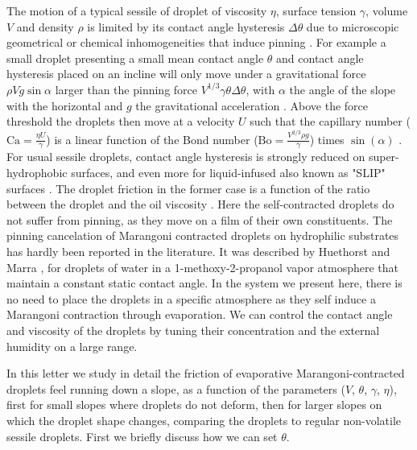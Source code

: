 \documentclass[aps,prl,reprint,superscriptaddress,amsmath,amssymb,]{revtex4-1}
\begin{document}
The motion of a typical sessile of droplet of viscosity $\eta$, surface tension $\gamma$, volume $V$ and density $\rho$ is limited by its contact angle hysteresis $\Delta \theta$ due to microscopic geometrical or chemical inhomogeneities that induce pinning \cite{furmidge1962studies, dussan1983ability, dussan1985ability}. For example a small droplet presenting a small mean contact angle $\theta$ and contact angle hysteresis placed on an incline will only move under a gravitational force $\rho V g \sin \alpha$ larger than the pinning force $V^{1/3} \gamma \theta \Delta \theta$, with $\alpha$ the angle of the slope with the horizontal and $g$ the gravitational acceleration \cite{kawasaki1960study, dussan1983ability, quere1998drops}. Above the force threshold the droplets then move at a velocity $U$ such that the capillary number ($\mathrm{Ca}=\frac{\eta U}{\gamma}$)  is a linear function of the Bond number ($\mathrm{Bo}=\frac{V^{2/3} \rho g}{\gamma}$) times $\sin( \alpha)$ \cite{Podgorski-2001, LeGrand-2005}. For usual sessile droplets, contact angle hysteresis is strongly reduced on super-hydrophobic surfaces, and even more for liquid-infused also known as "SLIP" surfaces \cite{wong2011bioinspired, Lafuma-2011, smith2013droplet}. The droplet friction in the former case is a function of the ratio between the droplet and the oil viscosity \cite{keiser2017drop}. Here the self-contracted droplets do not suffer from pinning, as they move on a film of their own constituents. The pinning cancelation of Marangoni contracted droplets on hydrophilic substrates has hardly been reported in the literature. It was described by Huethorst and Marra \cite{huethorst1991motion}, for droplets of water in a 1-methoxy-2-propanol vapor atmosphere that maintain a constant static contact angle. In the system we present here, there is no need to place the droplets in a specific atmosphere as they self induce a Marangoni contraction through evaporation. We can control the contact angle and viscosity of the droplets by tuning their concentration and the external humidity on a large range.


In this letter we study in detail the friction of evaporative Marangoni-contracted droplets feel running down a slope, as a function of the parameters ($V$, $\theta$, $\gamma$, $\eta$), first for small slopes where droplets do not deform, then for larger slopes on which the droplet shape changes, comparing the droplets to regular non-volatile sessile droplets. First we briefly discuss how we can set $\theta$.


\end{document}
